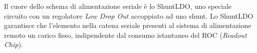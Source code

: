 
Il cuore dello schema di alimentazione seriale \`e lo ShuntLDO, uno speciale circuito con un regolatore \textit{Low Drop Out} accoppiato ad uno shunt. Lo ShuntLDO garantisce che l'elemento nella catena seriale presenti al sistema di alimentazione remoto un carico fisso, indipendente dal consumo istantaneo del ROC (\textit{Readout Chip}).




